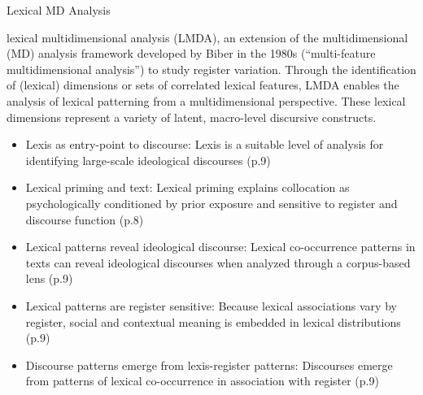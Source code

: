 \begin{frame}{Lexical MD Analysis}
    \scriptsize
    \vspace*{-4em}

    \begin{exampleblock}{\cite[p.1]{berbersardinhaLexicalMultiDimensionalAnalysis2025}}
    lexical multidimensional analysis (LMDA), an extension of the multidimensional (MD) analysis framework developed by Biber in the 1980s (``multi-feature multidimensional analysis'') to study register variation. Through the identification of (lexical) dimensions or sets of correlated lexical features, LMDA enables the analysis of lexical patterning from a multidimensional perspective. These lexical dimensions represent a variety of latent, macro-level discursive constructs.
    \end{exampleblock}

    \begin{itemize}
    \item Lexis as entry-point to discourse: Lexis is a suitable level of analysis for identifying large-scale ideological discourses (p.9)
    \item Lexical priming and text: Lexical priming \citep{hoeyLexicalPrimingNew2007} explains collocation as psychologically conditioned by prior exposure and sensitive to register and discourse function (p.8)
    \item Lexical patterns reveal ideological discourse: Lexical co-occurrence patterns in texts can reveal ideological discourses when analyzed through a corpus-based lens (p.9)
    \item Lexical patterns are register sensitive: Because lexical associations vary by register, social and contextual meaning is embedded in lexical distributions (p.9)
    \item Discourse patterns emerge from lexis-register patterns: Discourses emerge from patterns of lexical co-occurrence in association with register (p.9)
    \end{itemize}
\end{frame}






